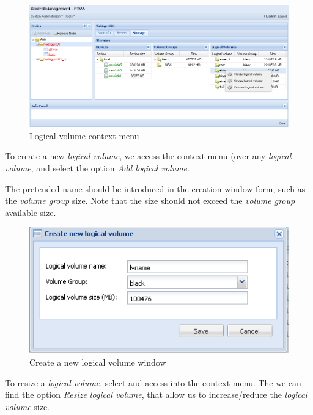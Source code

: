 \begin{figure}[H]
        \begin{center}
        \includegraphics[scale=0.45]{screenshots/node_storage_lv_ctx.png}
        \caption{Logical volume context menu}
        \label{fig:storage_lv_ctx}
        \end{center}
\end{figure}

To create a new \emph{logical volume}, we access the context menu (over any \emph{logical volume}, and select the option \emph{Add logical volume}.

The pretended name should be introduced in the creation window form, such as the \emph{volume group} size. Note that the size should not exceed the \emph{volume group} available size.

\begin{figure}[H]
        \begin{center}
        \includegraphics[scale=0.5]{screenshots/storage_lv_create.png}
        \caption{Create a new logical volume window}
        \label{fig:storage_lv_create}
        \end{center}
\end{figure}

To resize a \emph{logical volume}, select and access into the context menu. The we can find the option \emph{Resize logical volume}, that allow us to increase/reduce the \emph{logical volume} size.

